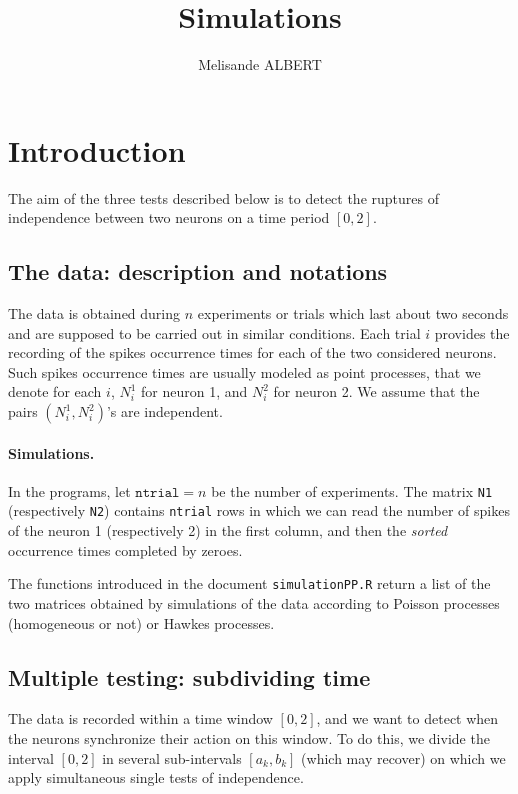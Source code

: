 \documentclass[a4paper,oneside,10pt]{article}
\title{Simulations}     %
\author{Melisande ALBERT}    %
\newcommand{\1}[1]{\ensuremath{\mathds{1}_{\left\{ #1 \right\}}}}  %
\begin{document}
\maketitle

\section{Introduction}

The aim of the three tests described below is to detect the ruptures of independence between two neurons on a time period $[0,2]$. 

\subsection{The data: description and notations}


The data is obtained during $n$ experiments or trials which last about two seconds and are supposed to be carried out in similar conditions.
Each trial $i$ provides the recording of the spikes occurrence times for each of the two considered neurons. Such spikes occurrence times are usually modeled as point processes, that we denote for each $i$, $N^1_i$ for neuron 1, and $N^2_i$ for neuron 2. 
We assume that the pairs $(N^1_i,N^2_i)$'s are independent.

\paragraph{Simulations.}
In the programs, let $\texttt{ntrial}=n$ be the number of experiments.
The matrix \texttt{N1} (respectively \texttt{N2}) contains \texttt{ntrial} rows in which we can read the number of spikes of the neuron 1 (respectively 2) in the first column, and then the \emph{sorted} occurrence times completed by zeroes.

The functions introduced in the document \texttt{simulationPP.R} return a list of the two matrices obtained by simulations of the data according to Poisson processes (homogeneous or not) or Hawkes processes.


\subsection{Multiple testing: subdividing time}

The data is recorded within a time window $[0,2]$, and we want to detect when the neurons synchronize their action on this window. 
To do this, we divide the interval $[0,2]$ in several sub-intervals $[a_k,b_k]$ (which may recover) on which we apply simultaneous single tests of independence. 
\end{document}
